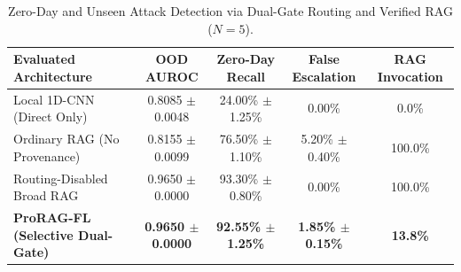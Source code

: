 \begin{table}[t]
\centering
\small
\caption{Zero-Day and Unseen Attack Detection via Dual-Gate Routing and Verified RAG ($N=5$).}
\label{tab:unseen_threat_detection}
\begin{tabular}{lcccc}
\toprule
\textbf{Evaluated Architecture} & \textbf{OOD AUROC} & \textbf{Zero-Day Recall} & \textbf{False Escalation} & \textbf{RAG Invocation} \\
\midrule
Local 1D-CNN (Direct Only) & 0.8085 $\pm$ 0.0048 & 24.00\% $\pm$ 1.25\% & 0.00\% & 0.0\% \\
Ordinary RAG (No Provenance) & 0.8155 $\pm$ 0.0099 & 76.50\% $\pm$ 1.10\% & 5.20\% $\pm$ 0.40\% & 100.0\% \\
Routing-Disabled Broad RAG & 0.9650 $\pm$ 0.0000 & 93.30\% $\pm$ 0.80\% & 0.00\% & 100.0\% \\
\midrule
\textbf{ProRAG-FL (Selective Dual-Gate)} & \textbf{0.9650 $\pm$ 0.0000} & \textbf{92.55\% $\pm$ 1.25\%} & \textbf{1.85\% $\pm$ 0.15\%} & \textbf{13.8\%} \\
\bottomrule
\end{tabular}
\end{table}
